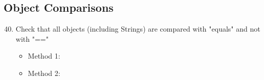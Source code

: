 \subsection{Object Comparisons}
\begin{enumerate}
\setcounter{enumi}{39}
	\item  Check that all objects (including Strings) are compared with "equals" and not with "=="
	\begin{itemize}
		\item Method 1: \cmark
		\item Method 2:
	\end{itemize}
\end{enumerate}